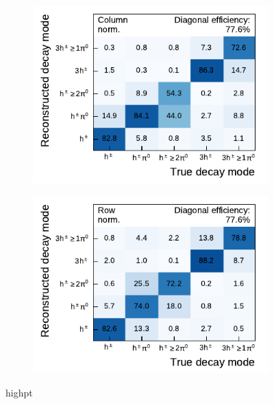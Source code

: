 \begin{figure}[htb]
\begin{subfigure}{0.48\textwidth}
  \end{subfigure}
  \begin{subfigure}{0.48\textwidth}
    \centering
    \includegraphics{./figures/decay_mode_classification/highpt/mig_mat_pt_geq_100.pdf}
  \end{subfigure}\hfill
  \begin{subfigure}{0.48\textwidth}
    \centering
    \includegraphics{./figures/decay_mode_classification/highpt/comp_mat_geq_100.pdf}
  \end{subfigure}
  \caption{highpt}
  \label{fig:highpt_matrices}
\end{figure}

